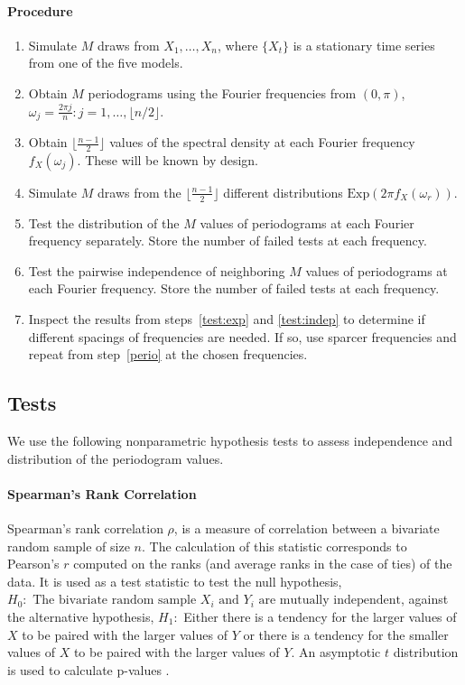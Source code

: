 \documentclass{article}\usepackage[]{graphicx}\usepackage[]{color}
\theoremstyle{plain}
\begin{document}
\paragraph{Procedure}
\begin{enumerate}
\item Simulate $M$ draws from $X_1,\dots, X_n$, where $\{X_t\}$ is a stationary time series from one of the five models.
\item \label{perio}Obtain $M$ periodograms using the Fourier frequencies from $(0, \pi)$, $\omega_j = \frac{2\pi j}{n}: j = 1, \dots, \lfloor n/2 \rfloor$.
\item Obtain $\lfloor\frac{n-1}{2}\rfloor$ values of the spectral density at each Fourier frequency $f_X(\omega_j)$. These will be known by design.
\item Simulate $M$ draws from the $\lfloor\frac{n-1}{2}\rfloor$ different distributions $\text{Exp}(2\pi f_X(\omega_r))$.
\item \label{test:exp}Test the distribution of the $M$ values of periodograms at each Fourier frequency separately. Store the number of failed tests at each frequency.
\item \label{test:indep}Test the pairwise independence of neighboring $M$ values of periodograms at each Fourier frequency. Store the number of failed tests at each frequency.
\item Inspect the results from steps~\ref{test:exp} and \ref{test:indep} to determine if different spacings of frequencies are needed. If so, use sparcer frequencies and repeat from step~\ref{perio} at the chosen frequencies.
\end{enumerate}


\subsection{Tests}

We use the following nonparametric hypothesis tests to assess independence and distribution of the periodogram values.

\paragraph{Spearman's Rank Correlation}
Spearman's rank correlation $\rho$, is a measure of correlation between a bivariate random sample of size $n$. The calculation of this statistic corresponds to Pearson's $r$ computed on the ranks (and average ranks in the case of ties) of the data. It is used as a test statistic to test the null hypothesis, $H_0: \text{ The bivariate random sample } X_i \text{ and } Y_i \text{ are mutually independent}$, against the alternative hypothesis, $H_1:$ Either there is a tendency for the larger values of $X$ to be paired with the larger values of $Y$ or there is a tendency for the smaller values of $X$ to be paired with the larger values of $Y$. An asymptotic $t$ distribution is used to calculate p-values \cite{conover1998practical}.
\end{document}
